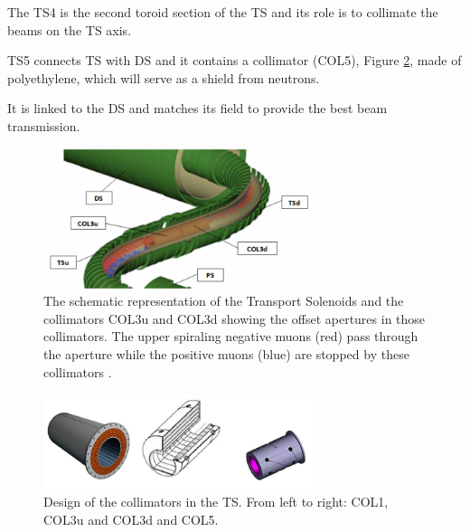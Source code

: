 The TS4 is the second toroid section of the TS and its role is 
to collimate the beams on the TS axis.

TS5 connects TS with DS and it contains a collimator (COL5), 
Figure \ref{fig:collimatorsshape}, made of polyethylene, 
{\red which will serve as a shield from neutrons.}

It is linked to the DS 
and matches its field to provide the best beam transmission.


\begin{figure}[!h]
    \centering
    \includegraphics[width =0.7\textwidth]{figures/png/800px-MuonBeamlineCollimators2.png}
    \caption[The Transport Solenoids and the collimators.]{The schematic representation of the Transport Solenoids and the collimators COL3u and 
    COL3d showing the offset apertures in those collimators. The 
    upper spiraling negative muons (red) pass through the aperture while 
    the positive muons (blue) are stopped by these collimators \cite{tsview}.}
    \label{fig:collimators}
    \end{figure}
    \begin{figure}[!h]
        \centering
        \includegraphics[width =0.7\textwidth]{figures/png/Screenshot_20240706_120535.png}
        \caption[The design of the collimators in the TS.]{Design of the collimators in the TS. From left to right: COL1, COL3u and COL3d
        and COL5.}
        \label{fig:collimatorsshape}
        \end{figure}

